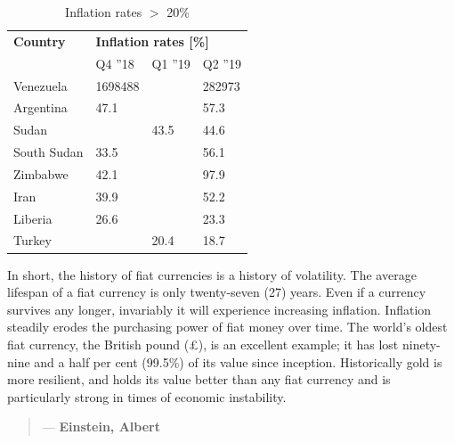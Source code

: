 \begin{table}
\centering
\caption{Inflation rates $>$ 20\%}
\begin{tabular}{@{}llll@{}}
\toprule
\textbf{Country} & \multicolumn{3}{l}{\textbf{Inflation rates {[}\%{]}}} \\ 
\textbf{}        & Q4 ''18          & Q1 ''19          & Q2 ''19         \\ \midrule
Venezuela        & 1698488          &                  & 282973          \\
Argentina        & 47.1             &                  & 57.3            \\
Sudan            &                  & 43.5            & 44.6            \\
South Sudan      & 33.5             &                  & 56.1            \\
Zimbabwe         & 42.1             &                  & 97.9           \\
Iran             & 39.9             &                  & 52.2            \\
Liberia          & 26.6             &                  & 23.3            \\
Turkey           &                  & 20.4            & 18.7           \\ \bottomrule
\end{tabular}
\label{tab:inflationratescountries}
\end{table}


\noindent In short, the history of fiat currencies is a history of volatility. The average lifespan of a fiat currency is only twenty-seven (27) years. Even if a currency survives any longer, invariably it will experience increasing inflation. Inflation steadily erodes the purchasing power of fiat money over time. The world's oldest fiat currency, the British pound (\pounds), is an excellent example; it has lost ninety-nine and a half per cent (99.5\%) of its value since inception. Historically gold is more resilient, and holds its value better than any fiat currency and is particularly strong in times of economic instability.

\begin{quotation}

  \textit{}
  \begin{flushright}
    \small{--- \textbf{Einstein, Albert}}
  \end{flushright}

\end{quotation}

